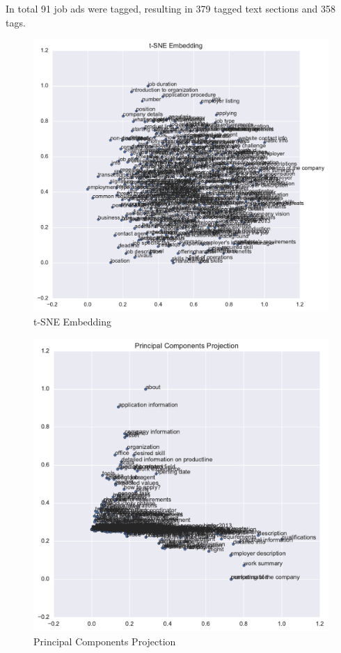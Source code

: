In total 91 job ads were tagged, resulting in 379 tagged text sections and 358 tags.


\begin{figure}[h]
    \centering
    \includegraphics[width=\textwidth]{img/paragraph-data-tSNE.pdf}
    \caption{t-SNE Embedding}
\label{fig:paragraph-data-tSNE}
\end{figure}

\begin{figure}[h]
    \centering
    \includegraphics[width=\textwidth]{img/paragraph-data-principal-components-projection.pdf}
    \caption{Principal Components Projection}
\label{fig:paragraph-data-principal-components-projection}
\end{figure}

